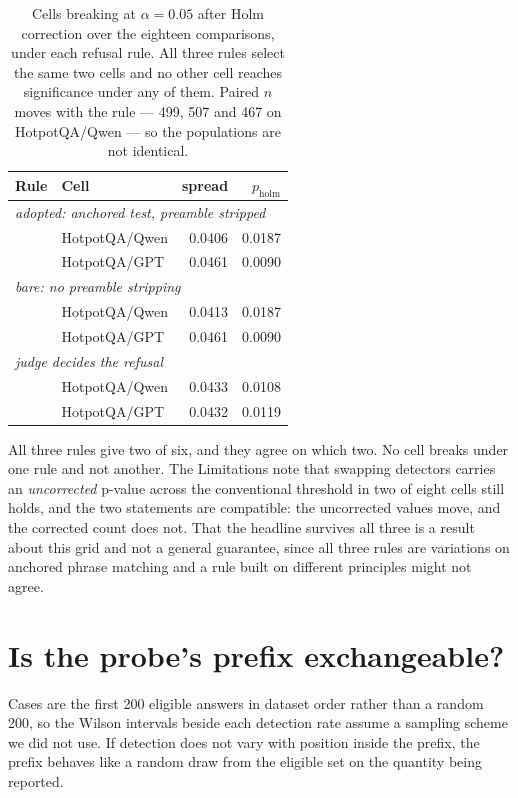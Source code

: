 \documentclass[11pt]{article}
\begin{document}
\begin{table}[t]
\centering\small
\begin{tabular}{llrr}
\toprule
\textbf{Rule} & \textbf{Cell} & spread & $p_{\mathrm{holm}}$ \\
\midrule
\multicolumn{4}{l}{\emph{adopted: anchored test, preamble stripped}} \\
 & HotpotQA/Qwen & 0.0406 & 0.0187 \\
 & HotpotQA/GPT & 0.0461 & 0.0090 \\
\midrule
\multicolumn{4}{l}{\emph{bare: no preamble stripping}} \\
 & HotpotQA/Qwen & 0.0413 & 0.0187 \\
 & HotpotQA/GPT & 0.0461 & 0.0090 \\
\midrule
\multicolumn{4}{l}{\emph{judge decides the refusal}} \\
 & HotpotQA/Qwen & 0.0433 & 0.0108 \\
 & HotpotQA/GPT & 0.0432 & 0.0119 \\
\bottomrule
\end{tabular}
\caption{Cells breaking at $\alpha = 0.05$ after Holm correction over the eighteen comparisons, under each refusal rule. All three rules select the same two cells and no other cell reaches significance under any of them. Paired $n$ moves with the rule --- 499, 507 and 467 on HotpotQA/Qwen --- so the populations are not identical.}
\label{tab:refusalrule}
\end{table}

All three rules give two of six, and they agree on which two. No cell breaks under one rule and not another. The Limitations note that swapping detectors carries an \emph{uncorrected} p-value across the conventional threshold in two of eight cells still holds, and the two statements are compatible: the uncorrected values move, and the corrected count does not. That the headline survives all three is a result about this grid and not a general guarantee, since all three rules are variations on anchored phrase matching and a rule built on different principles might not agree.

\section{Is the probe's prefix exchangeable?}
\label{app:prefix}

Cases are the first 200 eligible answers in dataset order rather than a random 200, so the Wilson intervals beside each detection rate assume a sampling scheme we did not use. If detection does not vary with position inside the prefix, the prefix behaves like a random draw from the eligible set on the quantity being reported.
\end{document}
